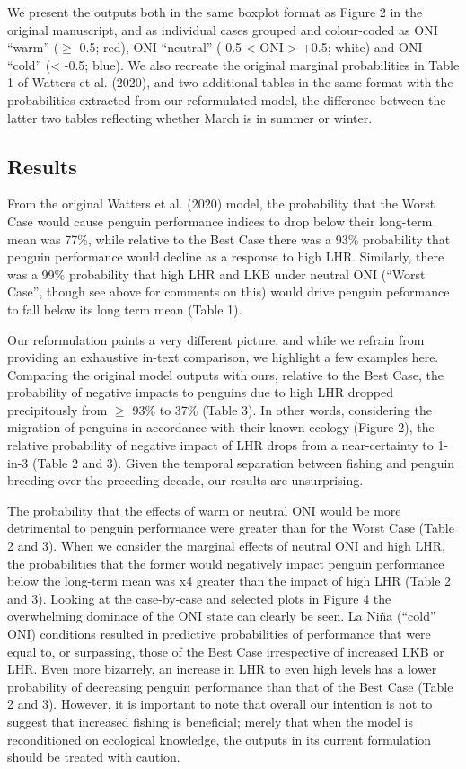 \documentclass[]{elsarticle} %
\begin{document}
We present the outputs both in the same boxplot format as Figure 2 in
the original manuscript, and as individual cases grouped and
colour-coded as ONI ``warm'' (\(\geqslant\) 0.5; red), ONI ``neutral''
(-0.5 \textless{} ONI \textgreater{} +0.5; white) and ONI ``cold''
(\textless{} -0.5; blue). We also recreate the original marginal
probabilities in Table 1 of Watters et al. (2020), and two additional
tables in the same format with the probabilities extracted from our
reformulated model, the difference between the latter two tables
reflecting whether March is in summer or winter.

\hypertarget{results}{%
\subsection{Results}\label{results}}

From the original Watters et al. (2020) model, the probability that the
Worst Case would cause penguin performance indices to drop below their
long-term mean was 77\%, while relative to the Best Case there was a
93\% probability that penguin performance would decline as a response to
high LHR. Similarly, there was a 99\% probability that high LHR and LKB
under neutral ONI (``Worst Case'', though see above for comments on
this) would drive penguin peformance to fall below its long term mean
(Table 1).

Our reformulation paints a very different picture, and while we refrain
from providing an exhaustive in-text comparison, we highlight a few
examples here. Comparing the original model outputs with ours, relative
to the Best Case, the probability of negative impacts to penguins due to
high LHR dropped precipitously from \(\geqslant\) 93\% to 37\% (Table
3). In other words, considering the migration of penguins in accordance
with their known ecology (Figure 2), the relative probability of
negative impact of LHR drops from a near-certainty to 1-in-3 (Table 2
and 3). Given the temporal separation between fishing and penguin
breeding over the preceding decade, our results are unsurprising.

The probability that the effects of warm or neutral ONI would be more
detrimental to penguin performance were greater than for the Worst Case
(Table 2 and 3). When we consider the marginal effects of neutral ONI
and high LHR, the probabilities that the former would negatively impact
penguin performance below the long-term mean was x4 greater than the
impact of high LHR (Table 2 and 3). Looking at the case-by-case and
selected plots in Figure 4 the overwhelming dominace of the ONI state
can clearly be seen. La Niña (``cold'' ONI) conditions resulted in
predictive probabilities of performance that were equal to, or
surpassing, those of the Best Case irrespective of increased LKB or LHR.
Even more bizarrely, an increase in LHR to even high levels has a lower
probability of decreasing penguin performance than that of the Best Case
(Table 2 and 3). However, it is important to note that overall our
intention is not to suggest that increased fishing is beneficial; merely
that when the model is reconditioned on ecological knowledge, the
outputs in its current formulation should be treated with caution.
\end{document}
